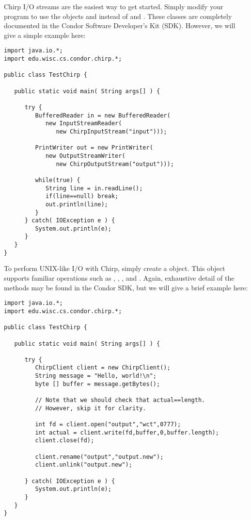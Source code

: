 Chirp I/O streams are the easiest way to get started.
Simply modify your program to use the objects 
and  instead of  and
.  These classes are completely documented
in the Condor Software Developer's Kit (SDK).  However, we will
give a simple example here:

\begin{verbatim}
import java.io.*;
import edu.wisc.cs.condor.chirp.*;

public class TestChirp {

   public static void main( String args[] ) {

      try {
         BufferedReader in = new BufferedReader(
            new InputStreamReader(
               new ChirpInputStream("input")));

         PrintWriter out = new PrintWriter(
            new OutputStreamWriter(
               new ChirpOutputStream("output")));

         while(true) {
            String line = in.readLine();
            if(line==null) break;
            out.println(line);
         }
      } catch( IOException e ) {
         System.out.println(e);
      }
   }
}
\end{verbatim}

To perform UNIX-like I/O with Chirp, simply create
a  object.  This object supports
familiar operations such as , ,
, and .  Again, exhaustive
detail of the methods may be found in the Condor 
SDK, but we will give a brief example here:

\begin{verbatim}
import java.io.*;
import edu.wisc.cs.condor.chirp.*;

public class TestChirp {

   public static void main( String args[] ) {

      try {
         ChirpClient client = new ChirpClient();
         String message = "Hello, world!\n";
         byte [] buffer = message.getBytes();

         // Note that we should check that actual==length.
         // However, skip it for clarity.

         int fd = client.open("output","wct",0777);
         int actual = client.write(fd,buffer,0,buffer.length);
         client.close(fd);

         client.rename("output","output.new");
         client.unlink("output.new");

      } catch( IOException e ) {
         System.out.println(e);
      }
   }
}
\end{verbatim}

